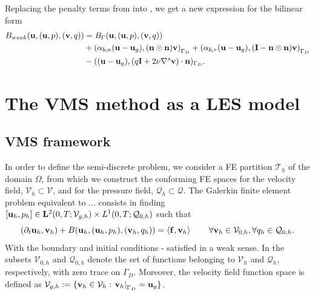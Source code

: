 Replacing the penalty terms from  into , we get a new expression for the bilinear form
\begin{align}
\label{eq-C7_bilinear_weak_by_components}
B_{weak}({\bf u},({\bf u},p),({\bf v},q))&=B_\Gamma({\bf u},({\bf u},p),({\bf v},q))\\\nonumber
&+\left(\alpha_{b,n}({\bf u}-{\bf u}_g),({\bf n}\otimes{\bf n}){\bf v}\right)_{\Gamma_D}+\left(\alpha_{b,\tau}({\bf u}-{\bf u}_g),(\mathbf{I}-{\bf n}\otimes{\bf n}){\bf v}\right)_{\Gamma_D}\\\nonumber
&-(({\bf u}-{\bf u}_g),(q\mathbf{I}+2\nu\nabla^s{\bf v})\cdot{\bf n})_{\Gamma_D}.
\end{align}

\section{The VMS method as a LES model}
\label{sec-C7_VMS}
\subsection{VMS framework}
In order to define the semi-discrete problem, we consider a FE partition $ \mathcal{T}_h $ of the domain $ \Omega $, from which we construct the conforming FE spaces for the velocity field, $ \mathcal{V}_h\subset\mathcal{V} $, and for the pressure field, $ \mathcal{Q}_h\subset\mathcal{Q} $. The Galerkin finite element problem equivalent to ... consists in finding $[{\bf u}_h,p_h]\in\mathbf{L}^2(0,T;\mathcal{V}_{g,h})\times L^1(0,T;\mathcal{Q}_{0,h})$ such that
\begin{equation}
\label{eq-C7_NS_galerkin}
(\partial_t{\bf u}_h,{\bf v}_h)+B({\bf u}_h,({\bf u}_h,p_h),({\bf v}_h,q_h)) =\left<{\bf f},{\bf v}_h\right>
\quad\quad\forall{\bf v}_h\in\mathcal{V}_{0,h},\forall q_h\in\mathcal{Q}_{0,h}.
\end{equation}
With the boundary and initial conditions - satisfied in a weak sense. In  the subsets $ \mathcal{V}_{0,h} $ and $ \mathcal{Q}_{0,h} $ denote the set of functions belonging to $ \mathcal{V}_h $ and $ \mathcal{Q}_h $, respectively, with zero trace on $ \Gamma_D $. Moreover, the velocity field function space is defined as $ \mathcal{V}_{g,h}:=\lbrace{\bf v}_h\in\mathcal{V}_h: \left.{\bf v}_h\right|_{\Gamma_D}={\bf u}_g\rbrace $.


